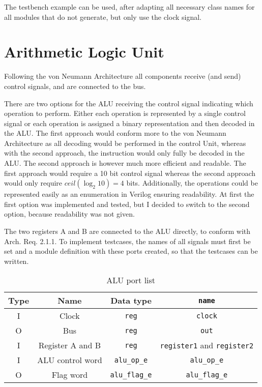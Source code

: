 The testbench example can be used, after adapting all necessary class names for all modules that do not generate, but only use the clock signal.

\section{Arithmetic Logic Unit}
Following the von Neumann Architecture all components receive (and send) control signals, and are connected to the bus. 

There are two options for the ALU receiving the control signal indicating which operation to perform. Either each operation is represented by a single control signal or each operation is assigned a binary representation and then decoded in the ALU. The first approach would conform more to the von Neumann Architecture as all decoding would be performed in the control Unit, whereas with the second approach, the instruction would only fully be decoded in the ALU. The second approach is however much more efficient and readable. The first approach would require a 10 bit control signal whereas the second approach would only require $ceil(\log_2 10) = 4$ bits. Additionally, the operations could be represented easily as an enumeration in Verilog ensuring readability. At first the first option was implemented and tested, but I decided to switch to the second option, because readability was not given. 

The two registers A and B are connected to the ALU directly, to conform with Arch. Req. 2.1.1. To implement testcases, the names of all signals must first be set and a module definition with these ports created, so that the testcases can be written.

\begin{table}[H]
\begin{centering}
\begin{tabular}{cccc}
  Type& Name & Data type & \texttt{name}\\ \hline
  I   & Clock & \texttt{reg} & \texttt{clock}\\
  O   & Bus     & \texttt{reg} & \texttt{out}        \\
  I   & Register A and B & \texttt{reg} & \texttt{register1} and \texttt{register2} \\
  I   & ALU control word & \texttt{alu\_op\_e} & \texttt{alu\_op\_e}\\
O   & Flag word & \texttt{alu\_flag\_e} & \texttt{alu\_flag\_e}
\end{tabular}
\end{centering}
\caption{ALU port list}
\label{tab:alu-i/o}
\end{table}

